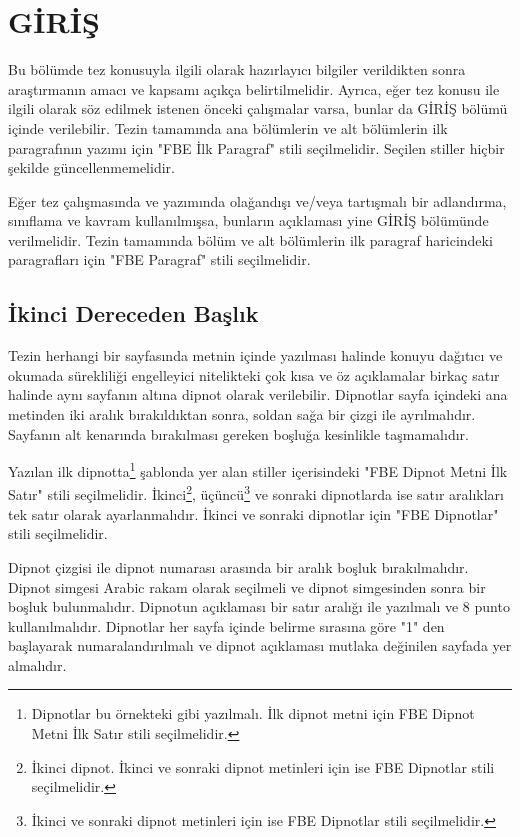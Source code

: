 
\chapter{GİRİŞ}
Bu bölümde tez konusuyla ilgili olarak hazırlayıcı bilgiler verildikten sonra araştırmanın amacı ve kapsamı açıkça belirtilmelidir. Ayrıca, eğer tez konusu ile ilgili olarak söz edilmek istenen önceki çalışmalar varsa, bunlar da GİRİŞ bölümü içinde verilebilir. Tezin tamamında ana bölümlerin ve alt bölümlerin ilk paragrafının yazımı için "FBE İlk Paragraf" stili seçilmelidir. Seçilen stiller hiçbir şekilde güncellenmemelidir.

Eğer tez çalışmasında ve yazımında olağandışı ve/veya tartışmalı bir adlandırma, sınıflama ve kavram kullanılmışsa, bunların açıklaması yine GİRİŞ bölümünde verilmelidir. Tezin tamamında bölüm ve alt bölümlerin ilk paragraf haricindeki paragrafları için "FBE Paragraf" stili seçilmelidir.

\section{İkinci Dereceden Başlık}
\noindent Tezin herhangi bir sayfasında metnin içinde yazılması halinde konuyu dağıtıcı ve okumada sürekliliği engelleyici nitelikteki çok kısa ve öz açıklamalar birkaç satır halinde aynı sayfanın altına dipnot olarak verilebilir. Dipnotlar sayfa içindeki ana metinden iki aralık bırakıldıktan sonra, soldan sağa bir çizgi ile ayrılmalıdır. Sayfanın alt kenarında bırakılması gereken boşluğa kesinlikle taşmamalıdır.

Yazılan ilk dipnotta\footnote{Dipnotlar bu örnekteki gibi yazılmalı. İlk dipnot metni için FBE Dipnot Metni İlk Satır stili seçilmelidir.}   şablonda yer alan stiller içerisindeki "FBE Dipnot Metni İlk Satır" stili seçilmelidir. İkinci\footnote{İkinci dipnot. İkinci ve sonraki dipnot metinleri için ise FBE Dipnotlar stili seçilmelidir.}, üçüncü\footnote{İkinci ve sonraki dipnot metinleri için ise FBE Dipnotlar stili seçilmelidir.} ve sonraki dipnotlarda ise satır aralıkları tek satır olarak ayarlanmalıdır. İkinci ve sonraki dipnotlar için "FBE Dipnotlar" stili seçilmelidir.

Dipnot çizgisi ile dipnot numarası arasında bir aralık boşluk bırakılmalıdır. Dipnot simgesi Arabic rakam olarak seçilmeli ve dipnot simgesinden sonra bir boşluk bulunmalıdır. Dipnotun açıklaması bir satır aralığı ile yazılmalı ve 8 punto kullanılmalıdır. Dipnotlar her sayfa içinde belirme sırasına göre "1" den başlayarak numaralandırılmalı ve dipnot açıklaması mutlaka değinilen sayfada yer almalıdır. 

